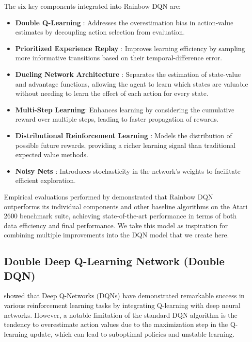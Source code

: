 \documentclass{article} %
\begin{document}
The six key components integrated into Rainbow DQN are:

\begin{itemize}
  \item \textbf{Double Q-Learning} \cite{van2016deep}: Addresses the overestimation bias in action-value estimates by decoupling action selection from evaluation.
  \item \textbf{Prioritized Experience Replay} \cite{schaul2016prioritized}: Improves learning efficiency by sampling more informative transitions based on their temporal-difference error.
  \item \textbf{Dueling Network Architecture} \cite{wang2016dueling}: Separates the estimation of state-value and advantage functions, allowing the agent to learn which states are valuable without needing to learn the effect of each action for every state.
  \item \textbf{Multi-Step Learning}: Enhances learning by considering the cumulative reward over multiple steps, leading to faster propagation of rewards.
  \item \textbf{Distributional Reinforcement Learning} \cite{bellemare2017distributional}: Models the distribution of possible future rewards, providing a richer learning signal than traditional expected value methods.
  \item \textbf{Noisy Nets} \cite{fortunato2018noisy}: Introduces stochasticity in the network's weights to facilitate efficient exploration.
\end{itemize}

Empirical evaluations performed by \cite{hessel2018rainbow} demonstrated that Rainbow DQN outperforms its individual components and other baseline algorithms on the Atari 2600 benchmark suite, achieving state-of-the-art performance in terms of both data efficiency and final performance. We take this model as inspiration for combining multiple improvements into the DQN model that we create here.

\subsection{Double Deep Q-Learning Network (Double DQN)}

\cite{mnih2015human} showed that Deep Q-Networks (DQNs) have demonstrated remarkable success in various reinforcement learning tasks by integrating Q-learning with deep neural networks. However, a notable limitation of the standard DQN algorithm is the tendency to overestimate action values due to the maximization step in the Q-learning update, which can lead to suboptimal policies and unstable learning.
\end{document}

